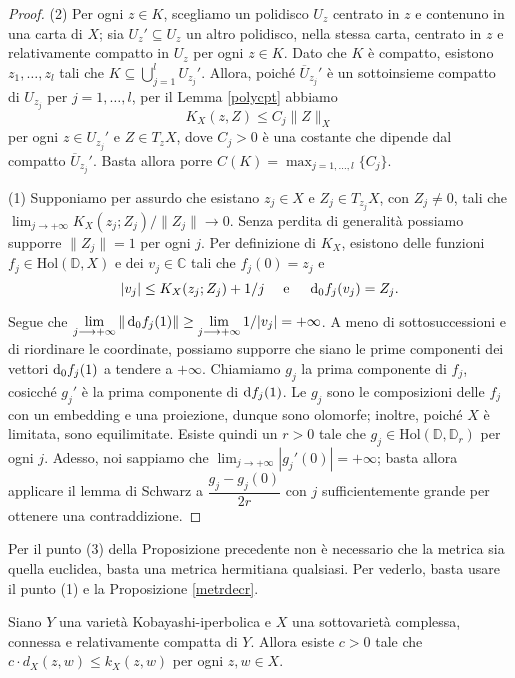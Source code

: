 \begin{proof}
    (2) Per ogni $z \in K$, scegliamo un polidisco $U_z$ centrato in $z$ e contenuno in una carta di $X$; sia $U_z'\subseteq U_z$ un altro polidisco, nella stessa carta, centrato in $z$ e relativamente compatto in $U_z$ per ogni $z \in K$. Dato che $K$ è compatto, esistono $z_1,\dots,z_l$ tali che $K\subseteq\displaystyle\bigcup_{j=1}^l U_{z_j}'$. Allora, poiché $\overline{U}_{z_j}'$ è un sottoinsieme compatto di $U_{z_j}$ per $j=1,\dots,l$, per il Lemma \ref{polycpt} abbiamo
    $$K_X(z,Z) \le C_j\|Z\|_X$$
    per ogni $z \in U_{z_j}'$ e $Z\in T_zX$, dove $C_j>0$ è una costante che dipende dal compatto $\overline{U}_{z_j}'$. Basta allora porre $C(K)=\displaystyle\max_{j=1,\dots,l}\{C_j\}$.

    (1) Supponiamo per assurdo che esistano $z_j \in X$ e $Z_j \in T_{z_j}X$, con $Z_j\not=0$, tali che $\displaystyle \lim_{j \longrightarrow +\infty} K_X(z_j;Z_j)/\|Z_j\| \longrightarrow 0$. Senza perdita di generalità possiamo supporre $\|Z_j\|=1$ per ogni $j$. Per definizione di $K_X$, esistono delle funzioni $f_j\in\text{Hol}(\mathbb{D},X)$ e dei $v_j \in \mathbb{C}$ tali che $f_j(0)=z_j$ e
    $$|v_j| \le K_X(z_j;Z_j)+1/j\quad\text{ e }\quad \mathop{}\!\mathrm{d}_0 f_j(v_j)=Z_j.$$

    Segue che $\displaystyle \lim_{j \longrightarrow +\infty}\|\mathop{}\!\mathrm{d}_0f_j(1)\| \ge \lim_{j \longrightarrow +\infty}1/|v_j|=+\infty$. A meno di sottosuccessioni e di riordinare le coordinate, possiamo supporre che siano le prime componenti dei vettori $\mathop{}\!\mathrm{d}_0f_j(1)$ a tendere a $+\infty$. Chiamiamo $g_j$ la prima componente di $f_j$, cosicché $g_j'$ è la prima componente di $\mathop{}\!\mathrm{d} f_j(1)$. Le $g_j$ sono le composizioni delle $f_j$ con un embedding e una proiezione, dunque sono olomorfe; inoltre, poiché $X$ è limitata, sono equilimitate. Esiste quindi un $r>0$ tale che $g_j \in \text{Hol}(\mathbb{D},\mathbb{D}_r)$ per ogni $j$. Adesso, noi sappiamo che $\displaystyle\lim_{j\longrightarrow +\infty} |g_j'(0)|=+\infty$; basta allora applicare il lemma di Schwarz a $\dfrac{g_j-g_j(0)}{2r}$ con $j$ sufficientemente grande per ottenere una contraddizione.
\end{proof}

\begin{oss} \label{basta_herm}
    Per il punto (3) della Proposizione precedente non è necessario che la metrica sia quella euclidea, basta una metrica hermitiana qualsiasi. Per vederlo, basta usare il punto (1) e la Proposizione \ref{metrdecr}.
\end{oss}

\begin{cor} \label{dist_da_sotto}
    Siano $Y$ una varietà Kobayashi-iperbolica e $X$ una sottovarietà complessa, connessa e relativamente compatta di $Y$. Allora esiste $c>0$ tale che $c\cdot d_X(z,w) \le k_X(z,w)$ per ogni $z,w \in X$.
\end{cor}

